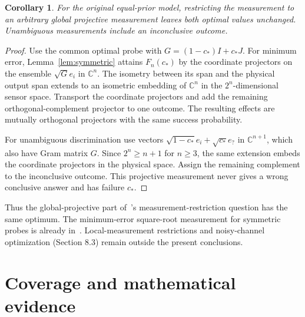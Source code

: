 \documentclass[11pt]{article}
\newtheorem{corollary}[theorem]{Corollary}
\begin{document}
\begin{corollary}\label{cor:projective}
For the original equal-prior model, restricting the measurement to an
arbitrary global projective measurement leaves both optimal values
unchanged. Unambiguous measurements include an inconclusive outcome.
\end{corollary}
\begin{proof}
Use the common optimal probe with $G=(1-c_*)I+c_*J$.
For minimum error, Lemma~\ref{lem:symmetric} attains $F_n(c_*)$
by the coordinate projectors on the ensemble $\sqrt G e_i$ in
$\mathbb C^n$. The isometry between its span and the physical output
span extends to an isometric embedding of $\mathbb C^n$ in the
$2^n$-dimensional sensor space. Transport the coordinate projectors
and add the remaining orthogonal-complement projector to one outcome.
The resulting effects are mutually orthogonal projectors with the same
success probability.

For unambiguous discrimination use vectors
$\sqrt{1-c_*}e_i+\sqrt{c_*}e_?$ in $\mathbb C^{n+1}$, which
also have Gram matrix $G$. Since $2^n\geq n+1$ for $n\geq3$,
the same extension embeds the coordinate projectors in the physical
space. Assign the remaining complement to the inconclusive outcome.
This projective measurement never gives a wrong conclusive answer
and has failure $c_*$.
\end{proof}
Thus the global-projective part of~\cite[Section 9]{ZGH}'s
measurement-restriction question has the same optimum. The
minimum-error square-root measurement for symmetric probes is already
in~\cite{EF,SLHCM24}. Local-measurement restrictions and noisy-channel
optimization (Section 8.3) remain outside the present conclusions.

\section{Coverage and mathematical evidence}
\end{document}

